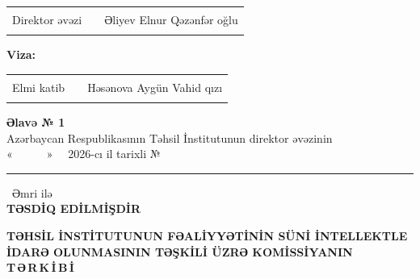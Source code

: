 \documentclass[12pt,a4paper]{article}
\newcommand{\xett}{\rule{45mm}{0.4pt}}
\newcommand{\imzaxetti}{\rule{40mm}{0.4pt}}
\begin{document}
\vspace{22pt}

\begin{flushleft}
\begin{tabular}{@{}p{60mm}p{45mm}p{62mm}@{}}
  Direktor əvəzi & \imzaxetti & Əliyev Elnur Qəzənfər oğlu \\
\end{tabular}
\end{flushleft}

\vspace{16pt}

\begin{flushleft}
  \textbf{Viza:}\\[6pt]
  \begin{tabular}{@{}p{60mm}p{45mm}p{62mm}@{}}
    Elmi katib & \imzaxetti & Həsənova Aygün Vahid qızı \\
  \end{tabular}
\end{flushleft}

\newpage

\begin{center}
  {\bfseries Əlavə № 1}\\[4pt]
  Azərbaycan Respublikasının Təhsil İnstitutunun direktor əvəzinin\\
  «\ \ \ \ \ \ » \ \ 2026-cı il tarixli №\ \xett\ Əmri ilə\\
  \textbf{TƏSDİQ EDİLMİŞDİR}
\end{center}

\vspace{16pt}

\begin{center}
  {\bfseries TƏHSİL İNSTİTUTUNUN FƏALİYYƏTİNİN SÜNİ İNTELLEKTLE\\
  İDARƏ OLUNMASININ TƏŞKİLİ ÜZRƏ KOMİSSİYANIN\\
  T\,Ə\,R\,K\,İ\,B\,İ}
\end{center}

\vspace{14pt}
\end{document}
